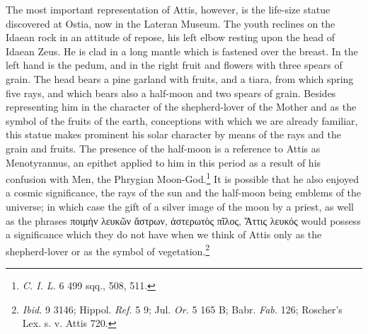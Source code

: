 \documentclass[a4paper, 11pt, oneside, polutonikogreek, french]{article}
\begin{document}
The most important representation of Attis, however, is the life-size statue discovered at Ostia, now in the Lateran Museum. The youth reclines on the Idaean rock in an attitude of repose, his left elbow resting upon the head of Idaean Zeus. He is clad in a long mantle which is fastened over the breast. In the left hand is the pedum, and in the right fruit and flowers with three spears of grain. The head bears a pine garland with fruits, and a tiara, from which spring five rays, and which bears also a half-moon and two spears of grain. Besides representing him in the character of the shepherd-lover of the Mother and as the symbol of the fruits of the earth, conceptions with which we are already familiar, this statue makes prominent his solar character by means of the rays and the grain and fruits. The presence of the half-moon is a reference to Attis as Menotyrannus, an epithet applied to him in this period as a result of his confusion with Men, the Phrygian Moon-God.\footnote{\emph{C. I. L.} 6 499 sqq., 508, 511.} It is possible that he also enjoyed a cosmic significance, the rays of the sun and the half-moon being emblems of the universe; in which case the gift of a silver image of the moon by a priest, as well as the phrases ποιμὴν λευκῶν ἄστρων, ἀστερωτὸς πῖλος, Ἄττις λευκός would possess a significance which they do not have when we think of Attis only as the shepherd-lover or as the symbol of vegetation.\footnote{\emph{Ibid.} 9 3146; Hippol. \emph{Ref.} 5 9; Jul. \emph{Or.} 5 165 B; Babr. \emph{Fab.} 126; Roscher's Lex. s. v. Attis 720.}
\end{document}
